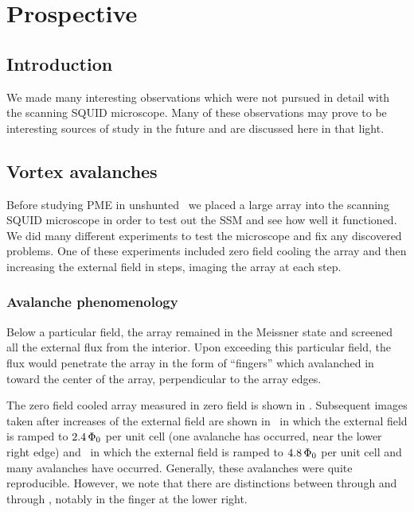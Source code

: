 \chapter{Prospective}
\label{chap:prospective}



\section{Introduction}

We made many interesting
observations which were not pursued in detail with the scanning 
SQUID microscope.
Many of these observations may prove to be interesting
sources of study in the future and are discussed here in that 
light. 

\section{Vortex avalanches}

Before studying PME in unshunted \jjas\ we placed a large array into the 
scanning SQUID microscope 
in order to test out the SSM and see how well it functioned. 
We did many different experiments to test
the microscope and fix any discovered problems.
One of these experiments included 
zero field cooling the array and then increasing the external field
in steps, imaging the array at each step. 

\subsection{Avalanche phenomenology}

Below a particular field, the array remained in the Meissner 
state and screened all the external flux from the interior. 
Upon exceeding this particular field, the flux would penetrate the array  
in the form of ``fingers'' which avalanched
in toward the center of the array, perpendicular to the array edges. 

The 
zero field cooled array measured in zero field is shown in 
. Subsequent 
images taken after increases 
of the external field are shown in 
\ in which the external 
field is ramped to $2.4\,\Phi_0$ per unit cell (one avalanche has
occurred, near the lower right edge) and
\ in which the external 
field is ramped to $4.8\,\Phi_0$ per unit cell and many 
avalanches have occurred. 
Generally, these avalanches were quite reproducible. However, we
note that there are distinctions between 
 through 
 and
 through
, notably in the finger at the
lower right. 


